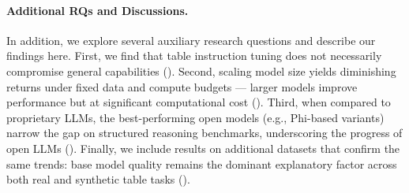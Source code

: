 \documentclass[11pt]{article}
\begin{document}
\paragraph{Additional RQs and Discussions.}
In addition, we explore several auxiliary research questions and describe our findings here.
First, we find that table instruction tuning does not necessarily compromise general capabilities ().
Second, scaling model size yields diminishing returns under fixed data and compute budgets — larger models improve performance but at significant computational cost ().
Third, when compared to proprietary LLMs, the best-performing open models (e.g., Phi-based variants) narrow the gap on structured reasoning benchmarks, underscoring the progress of open LLMs ().
Finally, we include results on additional datasets that confirm the same trends: base model quality remains the dominant explanatory factor across both real and synthetic table tasks ().


\end{document}

